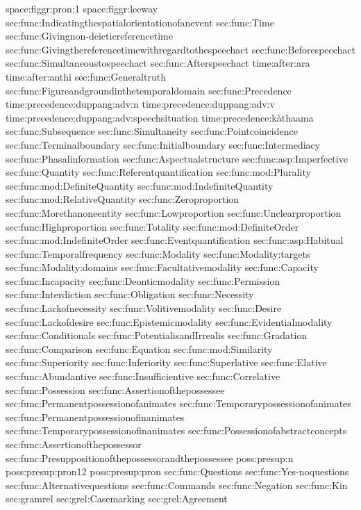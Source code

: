 {space:figgr:pron:1}
{space:figgr:leeway}
{sec:func:Indicatingthespatialorientationofanevent}
{sec:func:Time}
{sec:func:Givingnon-deicticreferencetime}
{sec:func:Givingthereferencetimewithregardtothespeechact}
{sec:func:Beforespeechact}
{sec:func:Simultaneoustospeechact}
{sec:func:Afterspeechact}
{time:after:ara}
{time:after:anthi}
{sec:func:Generaltruth}
{sec:func:Figureandgroundinthetemporaldomain}
{sec:func:Precedence}
{time:precedence:duppang:adv:n}
{time:precedence:duppang:adv:v}
{time:precedence:duppang:adv:speechsituation}
{time:precedence:kàthaama}
{sec:func:Subsequence}
{sec:func:Simultaneity}
{sec:func:Pointcoincidence}
{sec:func:Terminalboundary}
{sec:func:Initialboundary}
{sec:func:Intermediacy}
{sec:func:Phasalinformation}
{sec:func:Aspectualstructure}
{sec:func:asp:Imperfective}
{sec:func:Quantity}
{sec:func:Referentquantification}
{sec:func:mod:Plurality}
{sec:func:mod:DefiniteQuantity}
{sec:func:mod:IndefiniteQuantity}
{sec:func:mod:RelativeQuantity}
{sec:func:Zeroproportion}
{sec:func:Morethanoneentity}
{sec:func:Lowproportion}
{sec:func:Unclearproportion}
{sec:func:Highproportion}
{sec:func:Totality}
{sec:func:mod:DefiniteOrder}
{sec:func:mod:IndefiniteOrder}
{sec:func:Eventquantification}
{sec:func:asp:Habitual}
{sec:func:Temporalfrequency}
{sec:func:Modality}
{sec:func:Modality:targets}
{sec:func:Modality:domains}
{sec:func:Facultativemodality}
{sec:func:Capacity}
{sec:func:Incapacity}
{sec:func:Deonticmodality}
{sec:func:Permission}
{sec:func:Interdiction}
{sec:func:Obligation}
{sec:func:Necessity}
{sec:func:Lackofnecessity}
{sec:func:Volitivemodality}
{sec:func:Desire}
{sec:func:Lackofdesire}
{sec:func:Epistemicmodality}
{sec:func:Evidentialmodality}
{sec:func:Conditionals}
{sec:func:PotentialisandIrrealis}
{sec:func:Gradation}
{sec:func:Comparison}
{sec:func:Equation}
{sec:func:mod:Similarity}
{sec:func:Superiority}
{sec:func:Inferiority}
{sec:func:Superlative}
{sec:func:Elative}
{sec:func:Abundantive}
{sec:func:Insufficientive}
{sec:func:Correlative}
{sec:func:Possession}
{sec:func:Assertionofthepossessee}
{sec:func:Permanentpossessionofanimates}
{sec:func:Temporarypossessionofanimates}
{sec:func:Permanentpossessionofinanimates}
{sec:func:Temporarypossessionofinanimates}
{sec:func:Possessionofabstractconcepts}
{sec:func:Assertionofthepossessor}
{sec:func:Presuppositionofthepossessorandthepossessee}
{poss:presup:n}
{poss:presup:pron12}
{poss:presup:pron}
{sec:func:Questions}
{sec:func:Yes-noquestions}
{sec:func:Alternativequestions}
{sec:func:Commands}
{sec:func:Negation}
{sec:func:Kin}
{sec:gramrel}
{sec:grel:Casemarking}
{sec:grel:Agreement}
